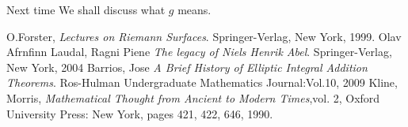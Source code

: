 \documentclass[11pt]{amsart}
\theoremstyle{definition}
\begin{document}
\indent Next time We shall discuss what $g$ means.

\begin{thebibliography}{30}
O.Forster, \emph{Lectures on Riemann Surfaces}. Springer-Verlag, New York, 1999.
Olav Afrnfinn Laudal, Ragni Piene \emph{The legacy of Niels Henrik Abel}. Springer-Verlag, New York, 2004
Barrios, Jose \emph{A Brief History of Elliptic Integral Addition Theorems}. Ros-Hulman Undergraduate Mathematics Journal:Vol.10, 2009
Kline, Morris, \emph{Mathematical Thought from Ancient to Modern Times},vol. 2, Oxford University Press: New York, pages 421, 422, 646, 1990.
\end{thebibliography}
\end{document}

